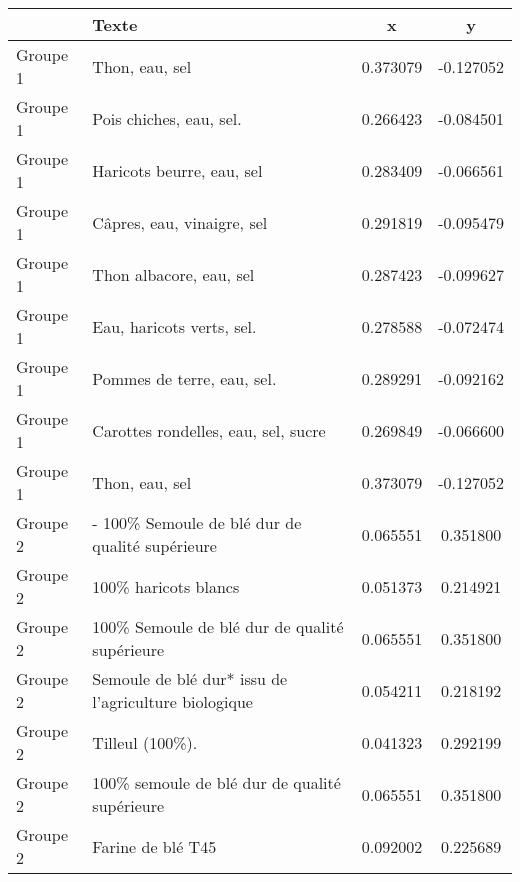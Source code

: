 \begin{tabular}{llcc}
\toprule
{} &                                                                Texte &         x &         y \\
\midrule
Groupe 1 &                                                       Thon, eau, sel &  0.373079 & -0.127052 \\
Groupe 1 &                                              Pois chiches, eau, sel. &  0.266423 & -0.084501 \\
Groupe 1 &                                            Haricots beurre, eau, sel &  0.283409 & -0.066561 \\
Groupe 1 &                                           Câpres, eau, vinaigre, sel &  0.291819 & -0.095479 \\
Groupe 1 &                                              Thon albacore, eau, sel &  0.287423 & -0.099627 \\
Groupe 1 &                                            Eau, haricots verts, sel. &  0.278588 & -0.072474 \\
Groupe 1 &                                           Pommes de terre, eau, sel. &  0.289291 & -0.092162 \\
Groupe 1 &                                  Carottes rondelles, eau, sel, sucre &  0.269849 & -0.066600 \\
Groupe 1 &                                                       Thon, eau, sel &  0.373079 & -0.127052 \\
Groupe 2 &                      - 100\% Semoule de blé dur de qualité supérieure &  0.065551 &  0.351800 \\
Groupe 2 &                                                 100\% haricots blancs &  0.051373 &  0.214921 \\
Groupe 2 &                        100\% Semoule de blé dur de qualité supérieure &  0.065551 &  0.351800 \\
Groupe 2 &               Semoule de blé dur* \newline *issu de l'agriculture biologique &  0.054211 &  0.218192 \\
Groupe 2 &                                                      Tilleul (100\%). &  0.041323 &  0.292199 \\
Groupe 2 &                        100\% semoule de blé dur de qualité supérieure &  0.065551 &  0.351800 \\
Groupe 2 &                                                    Farine de blé T45 &  0.092002 &  0.225689 \\

\end{tabular}
